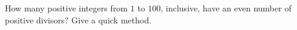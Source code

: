 How many positive integers from $1$ to $100$, inclusive, have an even number of positive divisors? Give a quick method.
